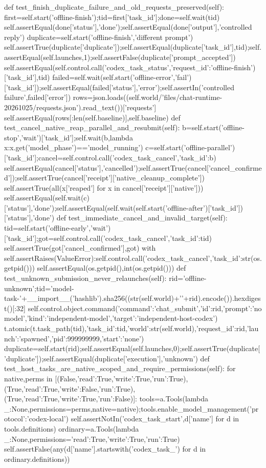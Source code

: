  def test_finish_duplicate_failure_and_old_requests_preserved(self):
  first=self.start('offline-finish');tid=first['task_id'];done=self.wait(tid)
  self.assertEqual(done['status'],'done');self.assertEqual(done['output'],'controlled reply')
  duplicate=self.start('offline-finish','different prompt')
  self.assertTrue(duplicate['duplicate']);self.assertEqual(duplicate['task_id'],tid);self.assertEqual(self.launches,1);self.assertFalse(duplicate['prompt_accepted'])
  self.assertEqual(self.control.call('codex_task_status',{'request_id':'offline-finish'})['task_id'],tid)
  failed=self.wait(self.start('offline-error','fail')['task_id']);self.assertEqual(failed['status'],'error');self.assertIn('controlled failure',failed['error'])
  rows=json.loads((self.world/'files/chat-runtime-20261025/requests.json').read_text())['requests']
  self.assertEqual(rows[:len(self.baseline)],self.baseline)
 def test_cancel_native_reap_parallel_and_resubmit(self):
  b=self.start('offline-stop','wait')['task_id'];self.wait(b,lambda x:x.get('model_phase')=='model_running')
  c=self.start('offline-parallel')['task_id'];cancel=self.control.call('codex_task_cancel',{'task_id':b})
  self.assertEqual(cancel['status'],'cancelled');self.assertTrue(cancel['cancel_confirmed']);self.assertTrue(cancel['receipt']['native_cleanup_complete'])
  self.assertTrue(all(x['reaped'] for x in cancel['receipt']['native']))
  self.assertEqual(self.wait(c)['status'],'done');self.assertEqual(self.wait(self.start('offline-after')['task_id'])['status'],'done')
 def test_immediate_cancel_and_invalid_target(self):
  tid=self.start('offline-early','wait')['task_id'];got=self.control.call('codex_task_cancel',{'task_id':tid})
  self.assertTrue(got['cancel_confirmed'],got)
  with self.assertRaises(ValueError):self.control.call('codex_task_cancel',{'task_id':str(os.getpid())})
  self.assertEqual(os.getpid(),int(os.getpid()))
 def test_unknown_submission_never_relaunches(self):
  rid='offline-unknown';tid='model-task-'+__import__('hashlib').sha256((str(self.world)+'\0'+rid).encode()).hexdigest()[:32]
  self.control.object.command({'command':'chat_submit','id':rid,'prompt':'no model','kind':'independent-model','target':'independent-host-codex'})
  t.atomic(t.task_path(tid),{'task_id':tid,'world':str(self.world),'request_id':rid,'launch':'spawned','pid':999999999,'start':'none'})
  duplicate=self.start(rid);self.assertEqual(self.launches,0);self.assertTrue(duplicate['duplicate']);self.assertEqual(duplicate['execution'],'unknown')
 def test_host_tasks_are_native_scoped_and_require_permissions(self):
  for native,perms in [(False,{'read':True,'write':True,'run':True}),(True,{'read':True,'write':False,'run':True}),(True,{'read':True,'write':True,'run':False})]:
   tools=a.Tools(lambda _:None,permissions=perms,native=native);tools.enable_model_management({'protocol':'codex-local'})
   self.assertNotIn('codex_task_start',{d['name'] for d in tools.definitions})
  ordinary=a.Tools(lambda _:None,permissions={'read':True,'write':True,'run':True})
  self.assertFalse(any(d['name'].startswith('codex_task_') for d in ordinary.definitions))

